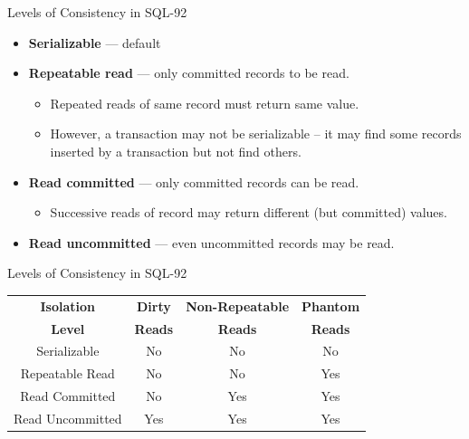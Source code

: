 \documentclass[aspectratio=169]{beamer}
\begin{document}
\begin{frame}{Levels of Consistency in SQL-92}

    \begin{itemize}
        \item \textbf{Serializable} — default
        \item \textbf{Repeatable read} — only committed records to be read.
            \begin{itemize}
                \item Repeated reads of same record must return same value.
                \item However, a transaction may not be serializable – it may find some records inserted by a transaction but not find others.
            \end{itemize}
        \item \textbf{Read committed} — only committed records can be read.
            \begin{itemize}
                \item Successive reads of record may return different (but committed) values.
            \end{itemize}
        \item \textbf{Read uncommitted} — even uncommitted records may be read.
    \end{itemize}

\end{frame}


\begin{frame}{Levels of Consistency in SQL-92}

    \footnotesize
    \centering
    \begin{tabular}{c c c c }
        \toprule
        \textbf{Isolation} & \textbf{Dirty} & \textbf{Non-Repeatable} & \textbf{Phantom} \\
        \textbf{Level} & \textbf{Reads} & \textbf{Reads} & \textbf{Reads} \\
        \midrule
        Serializable             & No                   & No                            & No                    \\
        Repeatable Read          & No                   & No                            & Yes                   \\
        Read Committed           & No                   & Yes                           & Yes                   \\
        Read Uncommitted         & Yes                  & Yes                           & Yes                   \\
        \bottomrule
    \end{tabular}
\end{frame}
\end{document}
